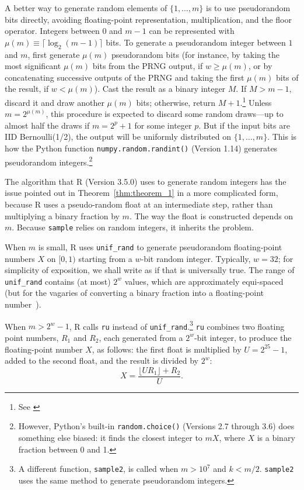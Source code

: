 \documentclass[12pt]{article}
\begin{document}
A better way to generate random elements of $\{1, \dots, m\}$ is to use pseudorandom bits directly,
avoiding floating-point representation, multiplication, and the floor operator. 
Integers between $0$ and $m-1$ can be represented with $\mu(m) \equiv \lceil \log_2(m-1) \rceil$ bits. 
To generate a pseudorandom integer between $1$ and $m$, first generate 
$\mu(m)$ pseudorandom bits (for instance, by taking the most significant $\mu(m)$ bits from the PRNG output, if $w \ge \mu(m)$, or by concatenating successive outputs of the PRNG and taking the
first $\mu(m)$ bits of the result, if $w < \mu(m)$).
Cast the result as a binary integer $M$.  
If $M > m-1$, discard it and draw another $\mu(m)$ bits; otherwise, return $M+1$.\footnote{%
   See \citet[p.114]{knuth_art_1997}
}
Unless $m = 2^{\mu(m)}$, this procedure is expected to discard some random draws---up to almost 
half the draws if $m = 2^p + 1$ for some integer $p$.
But if the input bits are IID Bernoulli(1/2), the output will be uniformly distributed on $\{1, \ldots, m\}$.
This is how the Python function \texttt{numpy.random.randint()} (Version 1.14) generates pseudorandom integers.\footnote{%
  However, Python's built-in \texttt{random.choice()} (Versions 2.7 through 3.6) does 
  something else biased: it finds the closest integer to $mX$, where $X$ is a binary fraction 
  between 0 and 1.
}

The algorithm that R (Version 3.5.0) \citep{R_2018} uses to generate random integers
has the issue pointed out in Theorem~\ref{thm:theorem_1} in a more complicated form, 
because R uses a pseudo-random float at an intermediate step, rather than multiplying a binary fraction
by $m$.
The way the float is constructed depends on $m$.
Because \texttt{sample} relies on random integers, it inherits the problem.

When $m$ is small, R uses \texttt{unif\_rand} to generate pseudorandom floating-point 
numbers $X$ on $[0, 1)$ starting from a $w$-bit random integer.
Typically, $w=32$; for simplicity of exposition, we shall write as if that is universally true.
The range of \texttt{unif\_rand} contains 
(at most) $2^w$ values, which are approximately equi-spaced (but for the vagaries of converting
a binary fraction into a floating-point number~\citep{goldberg91}).

When $m > 2^w-1$, R calls \texttt{ru} instead of \texttt{unif\_rand}.\footnote{
   A different function, \texttt{sample2}, is called when $m > 10^7$ and $k < m/2$.
\texttt{sample2} uses the same method to generate pseudorandom integers.
}
\texttt{ru} combines two floating point numbers, $R_1$ and $R_2$, each generated from a $2^w$-bit integer, 
to produce the floating-point number $X$, as follows:
the first float is multiplied by $U = 2^{25}-1$, added to the second float, and the result is divided by
$2^w$:
$$ X = \frac{\lfloor U R_1 \rfloor + R_2}{U}.$$
\end{document}
